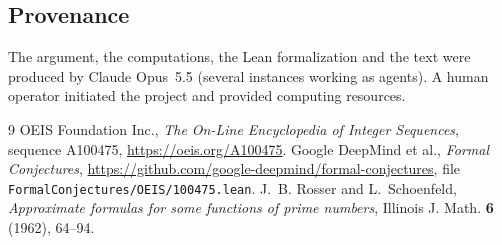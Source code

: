 \documentclass[11pt]{amsart}
\theoremstyle{remark}
\begin{document}
\subsection*{Provenance}
The argument, the computations, the Lean formalization and the text were produced by Claude Opus~5.5 (several instances working as agents).
A human operator initiated the project and provided computing resources.

\begin{thebibliography}{9}
 OEIS Foundation Inc., \emph{The On-Line Encyclopedia of Integer Sequences}, sequence A100475, \url{https://oeis.org/A100475}.
 Google DeepMind et al., \emph{Formal Conjectures}, \url{https://github.com/google-deepmind/formal-conjectures}, file \nolinkurl{FormalConjectures/OEIS/100475.lean}.
 J.~B. Rosser and L.~Schoenfeld, \emph{Approximate formulas for some functions of prime numbers}, Illinois J. Math. \textbf{6} (1962), 64--94.
\end{thebibliography}
\end{document}

